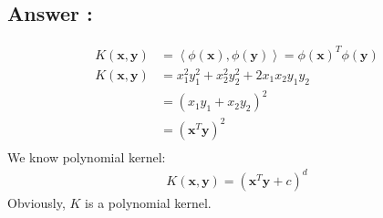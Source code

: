 \documentclass[a4paper,12pt]{article}
\begin{document}
\subsection*{Answer :}
\begin{align*}
    K(\bm{x}, \bm{y}) &= \left< \phi(\bm{x}),\phi(\bm{y})\right> = \phi(\bm{x})^T\phi(\bm{y}) \\
    K(\bm{x}, \bm{y}) &= x_1^2y_1^2 + x_2^2y_2^2 + 2x_1x_2y_1y_2 \\
    &= (x_1y_1 + x_2y_2)^2 \\
    &= (\bm{x}^T\bm{y})^2 \\
\end{align*}
We know polynomial kernel:
\begin{align*}
    K(\bm{x}, \bm{y}) = (\bm{x}^T\bm{y}+c)^d
\end{align*}
Obviously, \(K\) is a polynomial kernel. 
\end{document}
